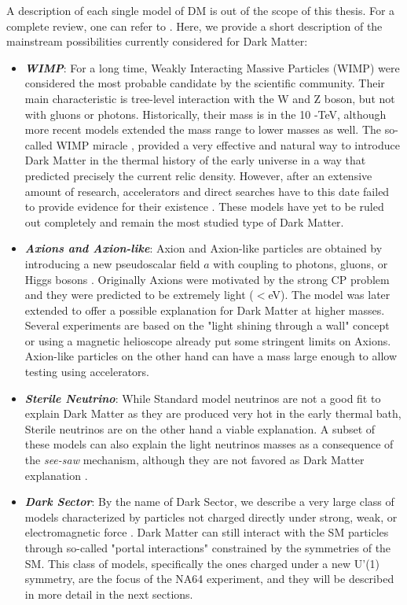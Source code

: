 A description of each single model of DM is out of the scope of this thesis. For a complete review, one can refer to \cite{battaglieri2017cosmic,Profumo:2019ujg,HAMBYE2020135553,alex2016dark,review-particle-physics,Feng:2010gw}. Here, we provide a short description of the mainstream possibilities currently considered for Dark Matter:
\begin{itemize}
\item \textbf{\textit{WIMP}}: For a long time, Weakly Interacting Massive Particles (WIMP) were considered the most probable candidate by the scientific community. Their main characteristic is tree-level interaction with the W and Z boson, but not with gluons or photons. Historically, their mass is in the 10 \gev-\si{\tera\electronvolt}, although more recent models extended the mass range to lower masses as well. The so-called WIMP miracle \cite{Chang:2013oia}, provided a very effective and natural way to introduce Dark Matter in the thermal history of the early universe in a way that predicted precisely the current relic density. However, after an extensive amount of research, accelerators and direct searches have to this date failed to provide evidence for their existence \cite{Arcadi:2017kky}. These models have yet to be ruled out completely and remain the most studied type of Dark Matter.
\item \textbf{\textit{Axions and Axion-like}}: Axion and Axion-like particles are obtained by introducing a new pseudoscalar field $a$ with coupling to photons, gluons, or Higgs bosons \cite{Marsh:2015xka}. Originally Axions were motivated by the strong CP problem and they were predicted to be extremely light ($<$\si{\electronvolt}). The model was later extended to offer a possible explanation for Dark Matter at higher masses. Several experiments are based on the "light shining through a wall" concept or using a magnetic helioscope \cite{annurev.nucl.56.080805.140513} already put some stringent limits on Axions. Axion-like particles on the other hand can have a mass large enough to allow testing using accelerators.
\item \textbf{\textit{Sterile Neutrino}}: While Standard model neutrinos are not a good fit to explain Dark Matter as they are produced very hot in the early thermal bath, Sterile neutrinos are on the other hand a viable explanation. A subset of these models can also explain the light neutrinos masses as a consequence of the \textit{see-saw} mechanism, although they are not favored as Dark Matter explanation \cite{Feng:2010gw}. 
\item \textbf{\textit{Dark Sector}}: By the name of Dark Sector, we describe a very large class of models characterized by particles not charged directly under strong, weak, or electromagnetic force \cite{alex2016dark}. Dark Matter can still interact with the SM particles through so-called "portal interactions" constrained by the symmetries of the SM. This class of models, specifically the ones charged under a new U'(1) symmetry, are the focus of the NA64 experiment, and they will be described in more detail in the next sections.
\end{itemize}

